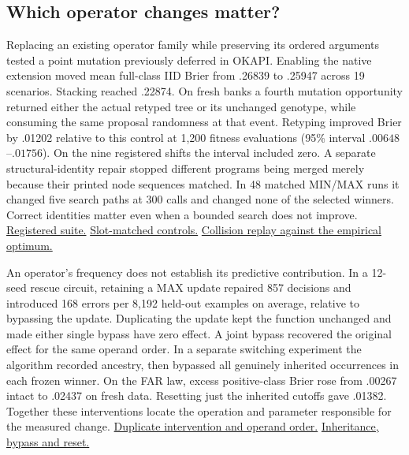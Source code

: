 \subsection{Which operator changes matter?}

Replacing an existing operator family while preserving its ordered arguments
tested a point mutation previously deferred in OKAPI. Enabling the native
extension moved mean full-class IID Brier from .26839 to .25947 across 19
scenarios. Stacking reached .22874. On fresh banks a fourth mutation
opportunity returned either the actual retyped tree or its unchanged
genotype, while consuming the same proposal randomness at that event.
Retyping improved Brier by .01202 relative to this control at 1,200 fitness
evaluations (95\% interval $.00648$--$.01756$). On the nine registered shifts
the interval included zero. A separate structural-identity repair stopped
different programs being merged merely because their printed node sequences
matched. In 48 matched MIN/MAX runs it changed five search paths at 300 calls
and changed none of the selected winners. Correct identities matter even when
a bounded search does not improve.
\href{https://github.com/damiankucharski/fusionbench/blob/d4c4bd1/docs/ensemble-study/full-suite-point/README.md}{Registered suite.}
\href{https://github.com/damiankucharski/fusionbench/blob/b93281d/docs/ensemble-study/mutation-opportunity/README.md}{Slot-matched controls.}
\href{https://github.com/damiankucharski/fusionbench/blob/949ec0d/docs/ensemble-study/search-regret/structural-key/README.md}{Collision replay against the empirical optimum.}

An operator's frequency does not establish its predictive contribution. In a
12-seed rescue circuit, retaining a MAX update repaired 857 decisions and
introduced 168 errors per 8,192 held-out examples on average, relative to
bypassing the update. Duplicating the update kept the
function unchanged and made either single bypass have zero effect. A joint
bypass recovered the original effect for the same operand order. In a
separate switching experiment the algorithm recorded ancestry, then bypassed
all genuinely inherited occurrences in each frozen winner. On the FAR law,
excess positive-class Brier rose from .00267 intact to .02437 on fresh data.
Resetting just the inherited cutoffs gave .01382. Together these interventions
locate the operation and parameter responsible for the measured change.
\href{https://github.com/damiankucharski/OKAPI/blob/9d06b7a/experiments/README.md}{Duplicate intervention and operand order.}
\href{https://github.com/damiankucharski/fusionbench/blob/eea68d5/docs/ensemble-study/search-regret/gate-necessity/README.md}{Inheritance, bypass and reset.}

